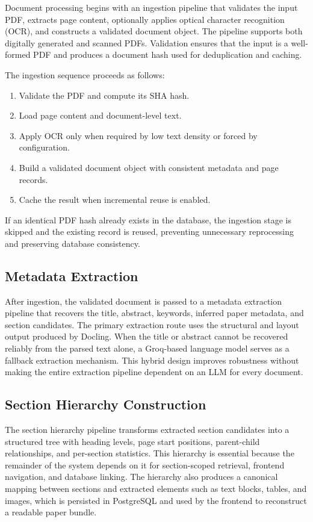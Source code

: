 \documentclass[12pt,a4paper]{report}
\begin{document}
Document processing begins with an ingestion pipeline that validates the input
PDF, extracts page content, optionally applies optical character recognition
(OCR), and constructs a validated document object. The pipeline supports both
digitally generated and scanned PDFs. Validation ensures that the input is a
well-formed PDF and produces a document hash used for deduplication and caching.

The ingestion sequence proceeds as follows:
\begin{enumerate}
    \item Validate the PDF and compute its SHA hash.
    \item Load page content and document-level text.
    \item Apply OCR only when required by low text density or forced by
    configuration.
    \item Build a validated document object with consistent metadata and page
    records.
    \item Cache the result when incremental reuse is enabled.
\end{enumerate}

If an identical PDF hash already exists in the database, the ingestion stage is
skipped and the existing record is reused, preventing unnecessary reprocessing
and preserving database consistency.

\subsection{Metadata Extraction}

After ingestion, the validated document is passed to a metadata extraction
pipeline that recovers the title, abstract, keywords, inferred paper metadata,
and section candidates. The primary extraction route uses the structural and
layout output produced by Docling. When the title or abstract cannot be
recovered reliably from the parsed text alone, a Groq-based language model
serves as a fallback extraction mechanism. This hybrid design improves
robustness without making the entire extraction pipeline dependent on an LLM for
every document.

\subsection{Section Hierarchy Construction}

The section hierarchy pipeline transforms extracted section candidates into a
structured tree with heading levels, page start positions, parent-child
relationships, and per-section statistics. This hierarchy is essential because
the remainder of the system depends on it for section-scoped retrieval, frontend
navigation, and database linking. The hierarchy also produces a canonical
mapping between sections and extracted elements such as text blocks, tables, and
images, which is persisted in PostgreSQL and used by the frontend to reconstruct
a readable paper bundle.
\end{document}
